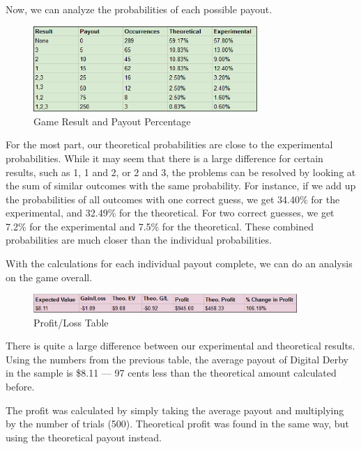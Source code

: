\documentclass{article}
\begin{document}
{\vspace{2ex}

Now, we can analyze the probabilities of each possible payout.

\vspace{5mm}
\begin{figure}[h]
\centering
\includegraphics[width=8.5cm]{images/oggameresults.png}
\caption{Game Result and Payout Percentage}
\end{figure}

For the most part, our theoretical probabilities are close to the experimental probabilities. While it may seem that there is a large difference for certain results, such as 1, 1 and 2, or 2 and 3, the problems can be resolved by looking at the sum of similar outcomes with the same probability. For instance, if we add up the probabilities of all outcomes with one correct guess, we get 34.40\% for the experimental, and 32.49\% for the theoretical. For two correct guesses, we get 7.2\% for the experimental and 7.5\% for the theoretical. These combined probabilities are much closer than the individual probabilities. 

\vspace{2ex}

With the calculations for each individual payout complete, we can do an analysis on the game overall. 

\begin{figure}[h]
\centering
\includegraphics[width=10cm]{images/ogprofit.png}
\caption{Profit/Loss Table}
\end{figure}
There is quite a large difference between our experimental and theoretical results. Using the numbers from the previous table, the average payout of Digital Derby in the sample is \$8.11 — 97 cents less than the theoretical amount calculated before. 

\vspace{2ex}

The profit was calculated by simply taking the average payout and multiplying by the number of trials (500). Theoretical profit was found in the same way, but using the theoretical payout instead. 

}
\end{document}
